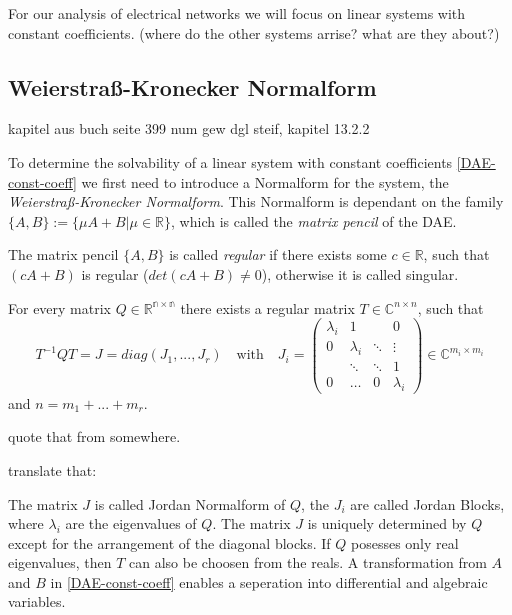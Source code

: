 For our analysis of electrical networks we will focus on linear systems with constant coefficients. (where do the other systems arrise? what are they about?)

\subsection{Weierstraß-Kronecker Normalform}
kapitel aus buch seite 399 num gew dgl steif, kapitel 13.2.2

To determine the solvability of a linear system with constant coefficients \ref{DAE-const-coeff} we first need to introduce a Normalform for the system, the \emph{Weierstraß-Kronecker Normalform}. This Normalform is dependant on the family $\{A,B\} := \{ \mu A+B|\mu \in \mathbb{R} \}$, which is called the  \emph{matrix pencil} of the DAE.

\begin{definition}
	The matrix pencil $\{ A,B\}$ is called \emph{regular} if there exists some $c \in \mathbb{R}$, such that $(cA+B)$ is regular ($det(cA+B) \neq 0$), otherwise it is called singular.
\end{definition}

\begin{theorem}
	For every matrix $Q \in \mathbb{R^{n \times n}}$ there exists a regular matrix $T \in \mathbb{C}^{n \times n}$, such that
	\begin{displaymath}
		T^{-1}QT = J = diag(J_1, ..., J_r) \quad \text{with} \quad J_i = 
		\left(
		\begin{matrix}
			\lambda_i & 1 & & 0 \\
			0 & \lambda_i & \ddots & \vdots \\
			& \ddots & \ddots & 1 \\
			0 & \hdots & 0 & \lambda_i
		\end{matrix}
		\right)
		\in \mathbb{C}^{m_i \times m_i}
	\end{displaymath} 
	and $n = m_1 + ... + m_r$.
\end{theorem}
quote that from somewhere.

translate that:

The matrix $J$ is called Jordan Normalform of $Q$, the $J_i$ are called Jordan Blocks, where $\lambda_i$ are the eigenvalues of $Q$. The matrix $J$ is uniquely determined by $Q$ except for the arrangement of the diagonal blocks. If $Q$ posesses only real eigenvalues, then $T$ can also be choosen from the reals. \newline
A transformation from $A$ and $B$ in \ref{DAE-const-coeff} enables a seperation into differential and algebraic variables.	

